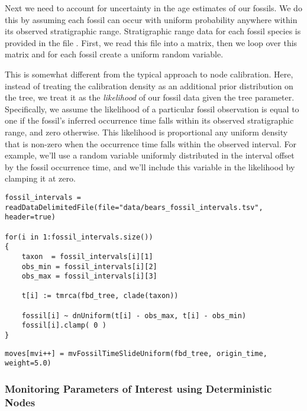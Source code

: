 Next we need to account for uncertainty in the age estimates of our fossils.
We do this by assuming each fossil can occur with uniform probability anywhere within its observed stratigraphic range.
Stratigraphic range data for each fossil species is provided in the file .
First, we read this file into a matrix, then we loop over this matrix and for each fossil create a uniform random variable.

This is somewhat different from the typical approach to node calibration.
Here, instead of treating the calibration density as an additional prior distribution on the tree, we treat it as the \textit{likelihood} of our fossil data given the tree parameter.
Specifically, we assume the likelihood of a particular fossil observation is equal to one if the fossil's inferred occurrence time falls within its observed stratigraphic range, and zero otherwise.
This likelihood is proportional any uniform density that is non-zero when the occurrence time falls within the observed interval.
For example, we'll use a random variable uniformly distributed in the interval offset by the fossil occurrence time, and we'll include this variable in the likelihood by clamping it at zero.

{\tt \begin{snugshade*}
\begin{lstlisting}
fossil_intervals = readDataDelimitedFile(file="data/bears_fossil_intervals.tsv", header=true)

for(i in 1:fossil_intervals.size())
{
    taxon  = fossil_intervals[i][1]
    obs_min = fossil_intervals[i][2]
    obs_max = fossil_intervals[i][3]
    
    t[i] := tmrca(fbd_tree, clade(taxon))
        
    fossil[i] ~ dnUniform(t[i] - obs_max, t[i] - obs_min)
    fossil[i].clamp( 0 )
}
\end{lstlisting}
\end{snugshade*}}


{\tt \begin{snugshade*}
\begin{lstlisting}
moves[mvi++] = mvFossilTimeSlideUniform(fbd_tree, origin_time, weight=5.0)
\end{lstlisting}
\end{snugshade*}}

\subsubsection{Monitoring Parameters of Interest using Deterministic Nodes}\label{subsub:RB-FBD-DetNodes}

